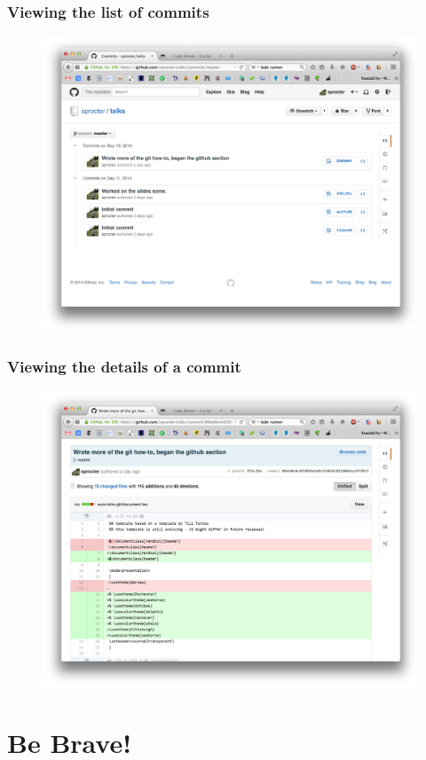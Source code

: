 \documentclass{beamer}
\begin{document}
\begin{frame}
\frametitle{Viewing the list of commits}

\begin{figure}[!t] \centering
\includegraphics[width=.8\textwidth]{figures/commit-history}
\end{figure}

\end{frame}

\begin{frame}
\frametitle{Viewing the details of a commit}

\begin{figure}[!t] \centering
\includegraphics[width=.8\textwidth]{figures/commit-diff}
\end{figure}

\end{frame}

\section{Be Brave!}
\end{document}
